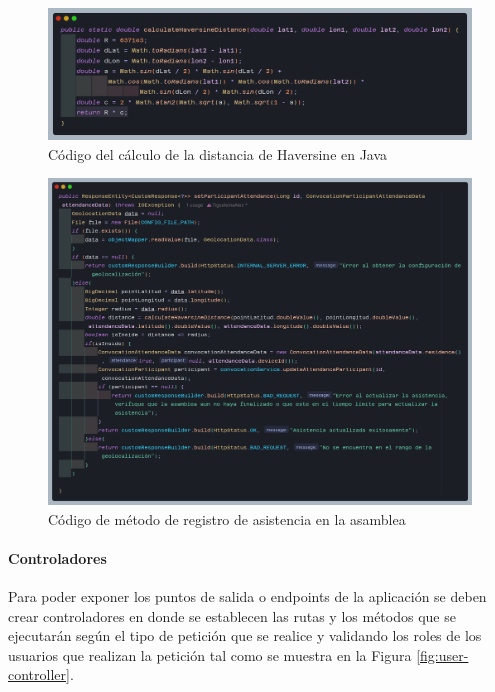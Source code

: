 \begin{figure}[H]
    \centering
    \includegraphics[width=1\textwidth]{resources/images/haversine}
    \caption{Código del cálculo de la distancia de Haversine en Java}
    \label{fig:haversine}
\end{figure}

\begin{figure}[H]
    \centering
    \includegraphics[width=1\textwidth]{resources/images/attendance-geolocation}
    \caption{Código de método de registro de asistencia en la asamblea}
    \label{fig:asamblea-asistencia-movil}
\end{figure}

\paragraph{Controladores}

Para poder exponer los puntos de salida o endpoints de la aplicación se deben crear controladores en donde se establecen las rutas y los métodos que se ejecutarán según el tipo de petición que se realice y validando los roles de los usuarios que realizan la petición tal como se muestra en la Figura \ref{fig:user-controller}.

